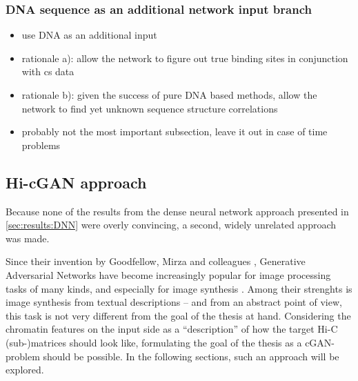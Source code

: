 \subsubsection{DNA sequence as an additional network input branch}
\begin{itemize}
 \item use DNA as an additional input
 \item rationale a): allow the network to figure out true binding sites in conjunction with cs data
 \item rationale b): given the success of pure DNA based methods, allow the network to find yet unknown sequence structure correlations
 \item probably not the most important subsection, leave it out in case of time problems
\end{itemize}

\subsection{Hi-cGAN approach} \label{sec:hi-cGAN}
Because none of the results from the dense neural network approach presented in \cref{sec:results:DNN} were overly convincing,
a second, widely unrelated approach was made.

Since their invention by Goodfellow, Mirza and colleagues \cite{Goodfellow2014, mirza2014},
Generative Adversarial Networks have become increasingly popular for image processing tasks of many kinds,
and especially for image synthesis \cite{Wang2020}. 
Among their strenghts is image synthesis from textual descriptions \cite{Reed2016,Zhang2019c,Zhu2019,Tao2020} --
and from an abstract point of view, this task is not very different from the goal of the thesis at hand.
Considering the chromatin features on the input side as a ``description'' of how the target Hi-C (sub-)matrices should look like,
formulating the goal of the thesis as a cGAN-problem should be possible.
In the following sections, such an approach will be explored.

